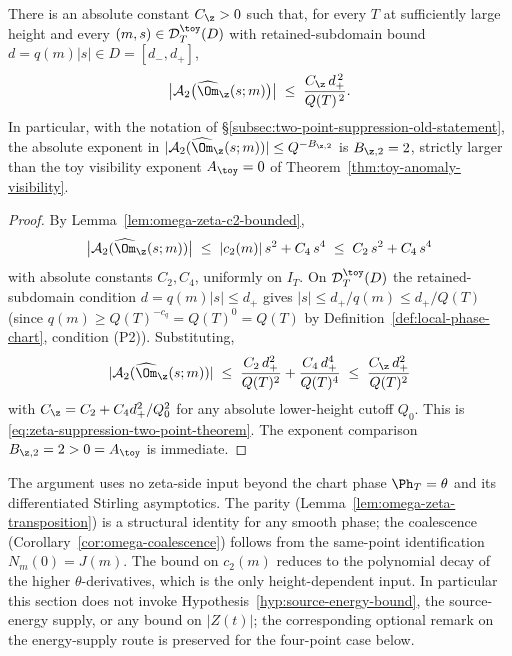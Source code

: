 \begin{theorem}
\label{thm:zeta-suppression-two-point}
There is an absolute constant \(C_\z>0\) such that, for every \(T\)
at sufficiently large height and every \((m,s)\in\mathcal D_T^\toy(D)\)
with retained-subdomain bound \(d=q(m)|s|\in D=[d_-,d_+]\),
\begin{equation}
\label{eq:zeta-suppression-two-point-theorem}
        \bigl|\mathcal A_2\bigl(\widehat\Om_\z(s;m)\bigr)\bigr|
        \;\le\; \frac{C_\z\,d_+^{\,2}}{Q(T)^{\,2}}.
\end{equation}
In particular, with the notation
of \S\ref{subsec:two-point-suppression-old-statement}, the absolute
exponent in
\(|\mathcal A_2(\widehat\Om_\z(s;m))|\le Q^{-B_{\z,2}}\) is
\(B_{\z,2}=2\), strictly larger than the toy visibility exponent
\(A_\toy=0\) of Theorem~\ref{thm:toy-anomaly-visibility}.
\end{theorem}

\begin{proof}
By Lemma~\ref{lem:omega-zeta-c2-bounded},
\[
        \bigl|\mathcal A_2(\widehat\Om_\z(s;m))\bigr|
        \;\le\; |c_2(m)|\,s^2 + C_4\,s^4
        \;\le\; C_2\,s^2 + C_4\,s^4
\]
with absolute constants \(C_2,C_4\), uniformly on \(I_T\).  On
\(\mathcal D_T^\toy(D)\) the retained-subdomain condition
\(d=q(m)|s|\le d_+\) gives \(|s|\le d_+/q(m)\le d_+/Q(T)\) (since
\(q(m)\ge Q(T)^{-c_q}=Q(T)^0=Q(T)\) by
Definition~\ref{def:local-phase-chart}, condition \textup{(P2)}).
Substituting,
\[
        |\mathcal A_2(\widehat\Om_\z(s;m))|
        \;\le\; \frac{C_2\,d_+^2}{Q(T)^2}
            +\frac{C_4\,d_+^4}{Q(T)^4}
        \;\le\; \frac{C_\z\,d_+^2}{Q(T)^2}
\]
with \(C_\z=C_2+C_4 d_+^2/Q_0^2\) for any absolute lower-height cutoff
\(Q_0\).  This is \eqref{eq:zeta-suppression-two-point-theorem}.  The
exponent comparison \(B_{\z,2}=2>0=A_\toy\) is immediate.
\end{proof}

\begin{remark}
\label{rem:two-point-suppression-source}
The argument uses no zeta-side input beyond the chart phase
\(\Ph_T=\theta\) and its differentiated Stirling asymptotics.  The
parity (Lemma~\ref{lem:omega-zeta-transposition}) is a structural
identity for any smooth phase; the coalescence
(Corollary~\ref{cor:omega-coalescence}) follows from the same-point
identification \(N_m(0)=J(m)\).  The bound on \(c_2(m)\) reduces to
the polynomial decay of the higher \(\theta\)-derivatives, which is
the only height-dependent input.  In particular this section does
not invoke
Hypothesis~\ref{hyp:source-energy-bound}, the source-energy supply,
or any bound on \(|Z(t)|\); the corresponding optional remark on the
energy-supply route is preserved for the four-point case below.
\end{remark}

